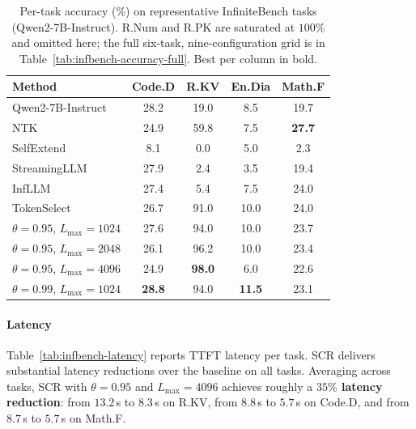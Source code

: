 \documentclass[10pt,conference]{IEEEtran}
\begin{document}
\begin{table}[t]
\centering
\caption{Per-task accuracy (\%) on representative InfiniteBench tasks
(Qwen2-7B-Instruct). R.Num and R.PK are
saturated at $100\%$ and omitted here; the full six-task,
nine-configuration grid is in Table~\ref{tab:infbench-accuracy-full}.
Best per column in bold.}
\label{tab:infbench-accuracy}
\small
\setlength{\tabcolsep}{5pt}
\begin{tabular}{lcccc}
\toprule
\textbf{Method} & \textbf{Code.D} & \textbf{R.KV} & \textbf{En.Dia} & \textbf{Math.F} \\
\midrule
Qwen2-7B-Instruct~\cite{yang2024qwen2}          & 28.2 & 19.0 & \phantom{0}8.5 & 19.7 \\
NTK~\cite{ntk2023web}                  & 24.9 & 59.8 & \phantom{0}7.5 & \textbf{27.7} \\
SelfExtend~\cite{jin2024selfextend}    & \phantom{0}8.1 & \phantom{0}0.0 & \phantom{0}5.0 & \phantom{0}2.3 \\
StreamingLLM~\cite{xiao2024efficient}  & 27.9 & \phantom{0}2.4 & \phantom{0}3.5 & 19.4 \\
InfLLM~\cite{xiao2024infllm}           & 27.4 & \phantom{0}5.4 & \phantom{0}7.5 & 24.0 \\
TokenSelect~\cite{tokenselect2025}     & 26.7 & 91.0 & 10.0 & 24.0 \\
\midrule
$\theta\!=\!0.95$, $L_{\max}\!=\!1024$      & 27.6 & 94.0 & 10.0 & 23.7 \\
$\theta\!=\!0.95$, $L_{\max}\!=\!2048$      & 26.1 & 96.2 & 10.0 & 23.4 \\
$\theta\!=\!0.95$, $L_{\max}\!=\!4096$      & 24.9 & \textbf{98.0} & \phantom{0}6.0 & 22.6 \\
$\theta\!=\!0.99$, $L_{\max}\!=\!1024$      & \textbf{28.8} & 94.0 & \textbf{11.5} & 23.1 \\
\bottomrule
\end{tabular}
\end{table}

\paragraph{Latency}
Table~\ref{tab:infbench-latency} reports TTFT latency per task. SCR
delivers substantial latency reductions over the baseline on all
tasks. Averaging across tasks, SCR with $\theta = 0.95$ and
$L_{\max} = 4096$ achieves roughly a \textbf{$35\%$ latency
reduction}: from $13.2$\,s to $8.3$\,s on R.KV,
from $8.8$\,s to $5.7$\,s on Code.D, and from
$8.7$\,s to $5.7$\,s on Math.F.
\end{document}
